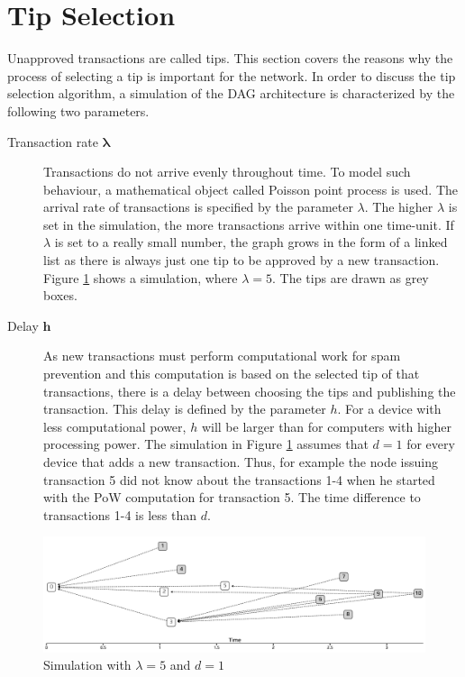 \section{Tip Selection}\label{tip-selection}

Unapproved transactions are called tips. This section covers the reasons why the process of selecting a tip is important for the network.
In order to discuss the tip selection algorithm, a simulation of the DAG architecture is characterized by the following two parameters. 


\begin{description}
    \item[Transaction rate $\bm{\lambda}$] Transactions do not arrive evenly throughout time. To model such behaviour, a mathematical object called Poisson point process is used. The arrival rate of transactions is specified by the parameter $\lambda$. The higher $\lambda$ is set in the simulation, the more transactions arrive within one time-unit. If $\lambda$ is set to a really small number, the graph grows in the form of a linked list as there is always just one tip to be approved by a new transaction. Figure \ref{fig:simulation} shows a simulation, where $\lambda=5$. The tips are drawn as grey boxes.
    \item[Delay $\bm{h}$] As new transactions must perform computational work for spam prevention and this computation is based on the selected tip of that transactions, there is a delay between choosing the tips and publishing the transaction. This delay is defined by the parameter $h$. For a device with less computational power, $h$ will be larger than for computers with higher processing power. The simulation in Figure \ref{fig:simulation} assumes that $d=1$ for every device that adds a new transaction. Thus, for example the node issuing transaction 5 did not know about the transactions 1-4 when he started with the PoW computation for transaction 5. The time difference to transactions 1-4 is less than $d$. 
\end{description}

\begin{figure}[H]
    \centering
    \includegraphics[width=1.0\textwidth]{images/simulation.png}
    \caption{Simulation with $\lambda=5$ and $d=1$  \cite{the-tangle-part-3}}
    \label{fig:simulation}
\end{figure}


